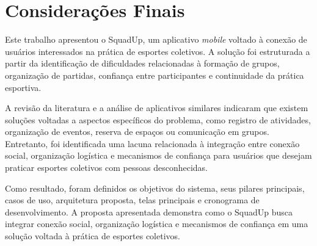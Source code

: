 \documentclass[a4paper, 12pt]{article}
\begin{document}
\begin{justify}
\begin{table}[H]
{\begin{tabular}{|l|c|c|c|c|c|c|c|c|c|c|c|c|c|c|c|}
\end{tabular}
}
\end{table}

\clearpage

\section{Considerações Finais}

Este trabalho apresentou o SquadUp, um aplicativo \textit{mobile} voltado à conexão de usuários interessados na prática de esportes coletivos. A solução foi estruturada a partir da identificação de dificuldades relacionadas à formação de grupos, organização de partidas, confiança entre participantes e continuidade da prática esportiva.

A revisão da literatura e a análise de aplicativos similares indicaram que existem soluções voltadas a aspectos específicos do problema, como registro de atividades, organização de eventos, reserva de espaços ou comunicação em grupos. Entretanto, foi identificada uma lacuna relacionada à integração entre conexão social, organização logística e mecanismos de confiança para usuários que desejam praticar esportes coletivos com pessoas desconhecidas.

Como resultado, foram definidos os objetivos do sistema, seus pilares principais, casos de uso, arquitetura proposta, telas principais e cronograma de desenvolvimento. A proposta apresentada demonstra como o SquadUp busca integrar conexão social, organização logística e mecanismos de confiança em uma solução voltada à prática de esportes coletivos.

\end{justify}

\clearpage


\end{document}
